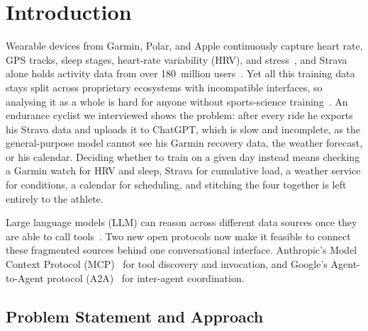 \section{Introduction}\label{sec:intro}

Wearable devices from Garmin, Polar, and Apple continuously capture heart rate, GPS tracks, sleep stages, heart-rate variability (HRV), and stress~\citep{seckin_review_2023}, and Strava alone holds activity data from over 180~million users~\citep{strava_trends_2025}. Yet all this training data stays split across proprietary ecosystems with incompatible interfaces, so analysing it as a whole is hard for anyone without sports-science training~\citep{bourdon_monitoring_2017}. An endurance cyclist we interviewed shows the problem: after every ride he exports his Strava data and uploads it to ChatGPT, which is slow and incomplete, as the general-purpose model cannot see his Garmin recovery data, the weather forecast, or his calendar. Deciding whether to train on a given day instead means checking a Garmin watch for HRV and sleep, Strava for cumulative load, a weather service for conditions, a calendar for scheduling, and stitching the four together is left entirely to the athlete.

Large language models (LLM) can reason across different data sources once they are able to call tools~\citep{schick_toolformer_2023, qu_tool_2024}. Two new open protocols now make it feasible to connect these fragmented sources behind one conversational interface. Anthropic's Model Context Protocol (MCP)~\citep{anthropic_mcp_2024} for tool discovery and invocation, and Google's Agent-to-Agent protocol (A2A)~\citep{google_a2a_2025} for inter-agent coordination.

\subsection{Problem Statement and Approach}\label{sec:intro:problem}

